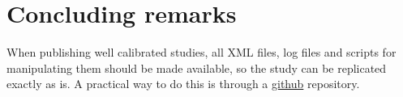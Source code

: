 \documentclass[oneside]{article}
\begin{document}




\section*{Concluding remarks}

When publishing well calibrated studies, all XML files, log files and
scripts for manipulating them should be made available, so the study can
be replicated exactly as is. A practical way to do this is through a
\href{http://github.com}{github} repository.
\end{document}
